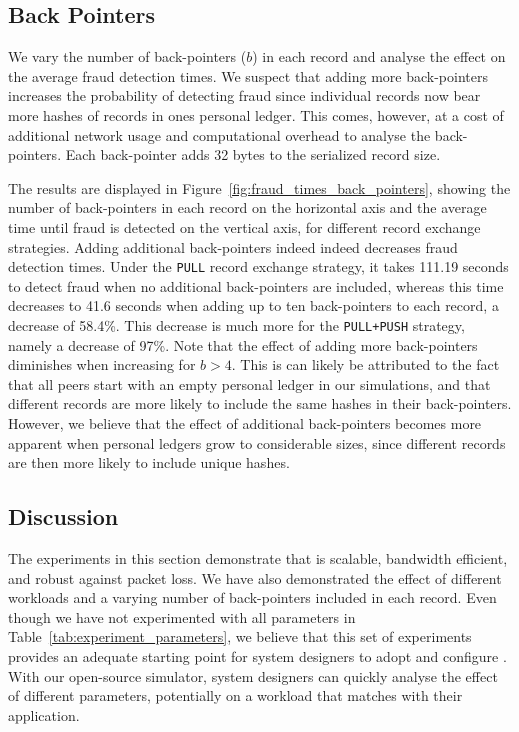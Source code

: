 \subsection{Back Pointers}
We vary the number of back-pointers ($ b $) in each record and analyse the effect on the average fraud detection times.
We suspect that adding more back-pointers increases the probability of detecting fraud since individual records now bear more hashes of records in ones personal ledger.
This comes, however, at a cost of additional network usage and computational overhead to analyse the back-pointers.
Each back-pointer adds 32 bytes to the serialized record size.

The results are displayed in Figure~\ref{fig:fraud_times_back_pointers}, showing the number of back-pointers in each record on the horizontal axis and the average time until fraud is detected on the vertical axis, for different record exchange strategies.
Adding additional back-pointers indeed indeed decreases fraud detection times.
Under the \texttt{PULL} record exchange strategy, it takes 111.19 seconds to detect fraud when no additional back-pointers are included, whereas this time decreases to 41.6 seconds when adding up to ten back-pointers to each record, a decrease of 58.4\%.
This decrease is much more for the \texttt{PULL+PUSH} strategy, namely a decrease of 97\%.
Note that the effect of adding more back-pointers diminishes when increasing for $ b > 4 $.
This is can likely be attributed to the fact that all peers start with an empty personal ledger in our simulations, and that different records are more likely to include the same hashes in their back-pointers.
However, we believe that the effect of additional back-pointers becomes more apparent when personal ledgers grow to considerable sizes, since different records are then more likely to include unique hashes.

\subsection{Discussion}
The experiments in this section demonstrate that \ModelName{} is scalable, bandwidth efficient, and robust against packet loss.
We have also demonstrated the effect of different workloads and a varying number of back-pointers included in each record.
Even though we have not experimented with all parameters in Table~\ref{tab:experiment_parameters}, we believe that this set of experiments provides an adequate starting point for system designers to adopt and configure \ModelName{}.
With our open-source simulator, system designers can quickly analyse the effect of different parameters, potentially on a workload that matches with their application.

